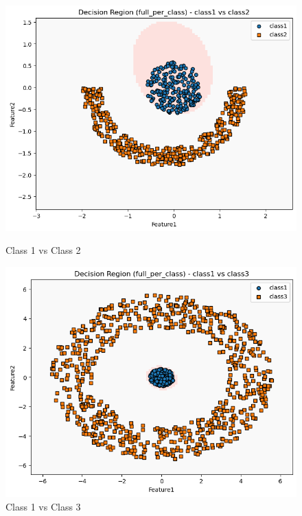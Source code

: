 \begin{figure}[H]
    \centering
    \begin{minipage}{0.32\linewidth}
        \includegraphics[width=\linewidth]{images/NLS_Group04_images/04_full_per_class/02_decision_region_c1_c2.png}
        \caption*{Class 1 vs Class 2}
    \end{minipage}
    \hfill
    \begin{minipage}{0.32\linewidth}
        \includegraphics[width=\linewidth]{images/NLS_Group04_images/04_full_per_class/03_decision_region_c1_c3.png}
        \caption*{Class 1 vs Class 3}
    \end{minipage}

\end{figure}

